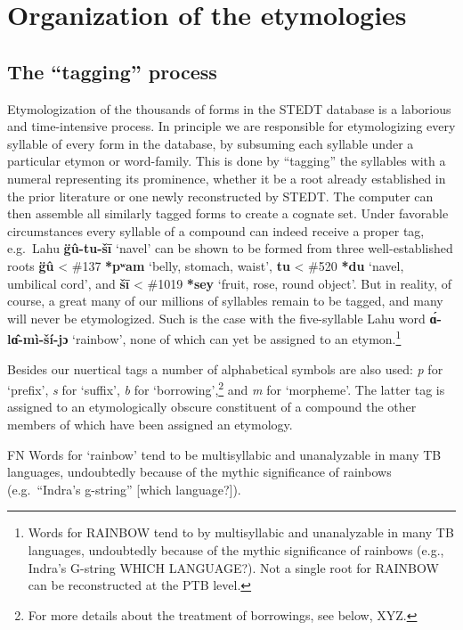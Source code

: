 \section{Organization of the etymologies}

\subsection{The “tagging” process}

Etymologization of the thousands of forms in the STEDT database is a laborious and time-intensive process. In principle we are responsible for etymologizing every syllable of every form in the database, by subsuming each syllable under a particular etymon or word-family. This is done by “tagging” the syllables with a numeral representing its prominence, whether it be a root already established in the prior literature or one newly reconstructed by STEDT. The computer can then assemble all similarly tagged forms to create a cognate set. Under favorable circumstances every syllable of a compound can indeed receive a proper tag, e.g.\ Lahu \textbf{g̈û-tu-šī} ‘navel’ can be shown to be formed from three well-established roots \textbf{g̈û} < \#137 \textbf{*pʷam} ‘belly, stomach, waist’, \textbf{tu} < \#520 \textbf{*du} ‘navel, umbilical cord’, and \textbf{šī} < \#1019 \textbf{*sey} ‘fruit, rose, round object’. But in reality, of course, a great many of our millions of syllables remain to be tagged, and many will never be etymologized. Such is the case with the five-syllable Lahu word \textbf{ɑ́-lɑ̂-mì-ší-jɔ} ‘rainbow’, none of which can yet be assigned to an etymon.\footnote{Words for RAINBOW tend to by multisyllabic and unanalyzable in many TB languages, undoubtedly because of the mythic significance of rainbows (e.g., Indra’s G-string WHICH LANGUAGE?). Not a single root for RAINBOW can be reconstructed at the PTB level.}

Besides our nuertical tags a number of alphabetical symbols are also used: \textit{p} for ‘prefix’, \textit{s} for ‘suffix’, \textit{b} for ‘borrowing’,\footnote{For more details about the treatment of borrowings, see below, XYZ.} and \textit{m} for ‘morpheme’. The latter tag is assigned to an etymologically obscure constituent of a compound the other members of which have been assigned an etymology.

FN Words for ‘rainbow’ tend to be multisyllabic and unanalyzable in many TB languages, undoubtedly because of the mythic significance of rainbows (e.g.\ “Indra’s g-string” [which language?]).

